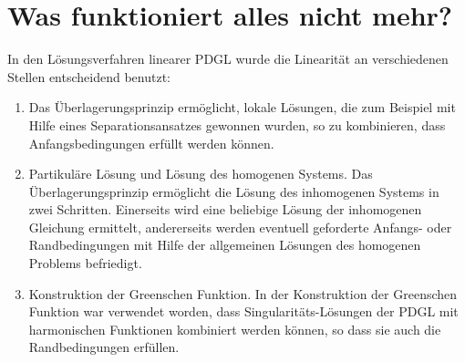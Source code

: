 %
%
%
\section{Was funktioniert alles nicht mehr?}
In den Lösungsverfahren linearer PDGL wurde die Linearität an verschiedenen
Stellen entscheidend benutzt:
\begin{enumerate}
\item
Das Überlagerungsprinzip ermöglicht, lokale Lösungen, die zum Beispiel
mit Hilfe eines Separationsansatzes gewonnen wurden, so zu kombinieren, dass
Anfangsbedingungen erfüllt werden können.
\item
Partikuläre Lösung und Lösung des homogenen Systems.
Das Überlagerungsprinzip ermöglicht die Lösung des inhomogenen Systems
in zwei Schritten. Einerseits wird eine beliebige Lösung der inhomogenen
Gleichung ermittelt, andererseits werden eventuell geforderte Anfangs-
oder Randbedingungen mit Hilfe der allgemeinen Lösungen des homogenen
Problems befriedigt.
\item
Konstruktion der Greenschen Funktion. In der Konstruktion der
Greenschen Funktion war verwendet worden, dass Singularitäts-Lösungen 
der PDGL mit harmonischen Funktionen kombiniert werden können, so 
dass sie auch die Randbedingungen erfüllen.
\end{enumerate}

